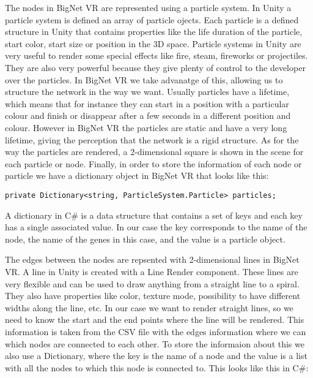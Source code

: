 The nodes in BigNet VR are represented using a particle system. In Unity a particle system\cite{particle_system} is defined an array of particle ojects. Each particle is a defined structure in Unity that contains properties like the life duration of the particle, start color, start size or position in the 3D space. Particle systems in Unity are very useful to render some special effects like fire, steam, fireworks or projectiles. They are also very powerful because they give plenty of control to the developer over the particles. In BigNet VR we take advanatge of this, allowing us to structure the network in the way we want. Usually particles have a lifetime, which means that for instance they can start in a position with a particular colour and finish or disappear after a few seconds in a different position and colour. However in BigNet VR the particles are static and have a very long lifetime, giving the perception that the network is a rigid structure. As for the way the particles are rendered, a 2-dimensional square is shown in the scene for each particle or node. Finally, in order to store the information of each node or particle we have a dictionary object in BigNet VR that looks like this:

\begin{verbatim}
private Dictionary<string, ParticleSystem.Particle> particles;
\end{verbatim}

A dictionary in C\# is a data structure that contains a set of keys and each key has a single associated value. In our case the key corresponds to the name of the node, the name of the genes in this case, and the value is a particle object.

The edges between the nodes are repsented with 2-dimensional lines in BigNet VR. A line in Unity is created with a Line Render component\cite{line_render}. These lines are very flexible and can be used to draw anything from a straight line to a spiral. They also have properties like color, texture mode, possibility to have different widths along the line, etc. In our case we want to render straight lines, so we need to know the start and the end points where the line will be rendered. This information is taken from the CSV file with the edges information where we can which nodes are connected to each other. To store the informaion about this we also use a Dictionary, where the key is the name of a node and the value is a list with all the nodes to which this node is connected to. This looks like this in C\#:

